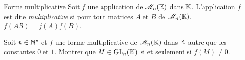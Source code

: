 \begin{defi}{Forme multiplicative}
    Soit $f$ une application de $\mathscr{M}_n(\mathbb{K})$ dans $\mathbb{K}$. L'application $f$ est dite \emph{multiplicative} si pour tout matrices $A$ et $B$ de $\mathscr{M}_n(\mathbb{K})$, $f(AB) = f(A)f(B)$.
\end{defi}
\begin{exercice}
    Soit $n \in \mathbb{N}^\star$ et $f$ une forme multiplicative de $\mathscr{M}_n(\mathbb{K})$ dans $\mathbb{K}$ autre que les constantes $0$ et $1$. Montrer que $M \in \mathrm{GL}_n(\mathbb{K})$ si et seulement si $f(M) \not= 0$. 
\end{exercice}